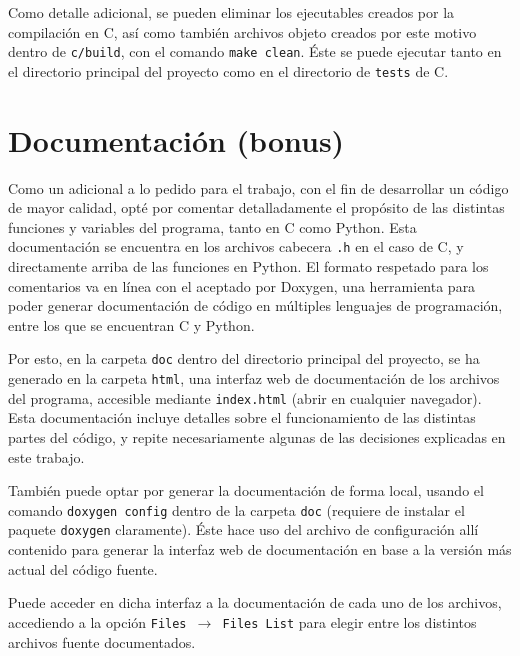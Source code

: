 \documentclass[a4paper]{article}
\begin{document}
Como detalle adicional, se pueden eliminar los ejecutables creados por la compilación en C, así como también archivos objeto creados por este motivo dentro de \texttt{c/build}, con el comando \texttt{make clean}. Éste se puede ejecutar tanto en el directorio principal del proyecto como en el directorio de \texttt{tests} de C.

\section{Documentación (bonus)}

Como un adicional a lo pedido para el trabajo, con el fin de desarrollar un código de mayor calidad, opté por comentar detalladamente el propósito de las distintas funciones y variables del programa, tanto en C como Python. Esta documentación se encuentra en los archivos cabecera \texttt{.h} en el caso de C, y directamente arriba de las funciones en Python. El formato respetado para los comentarios va en línea con el aceptado por Doxygen, una herramienta para poder generar documentación de código en múltiples lenguajes de programación, entre los que se encuentran C y Python. 

Por esto, en la carpeta \texttt{doc} dentro del directorio principal del proyecto, se ha generado en la carpeta \texttt{html}, una interfaz web de documentación de los archivos del programa, accesible mediante \texttt{index.html} (abrir en cualquier navegador). Esta documentación incluye detalles sobre el funcionamiento de las distintas partes del código, y repite necesariamente algunas de las decisiones explicadas en este trabajo.

También puede optar por generar la documentación de forma local, usando el comando \texttt{doxygen config} dentro de la carpeta \texttt{doc} (requiere de instalar el paquete \texttt{doxygen} claramente). Éste hace uso del archivo de configuración allí contenido para generar la interfaz web de documentación en base a la versión más actual del código fuente.

Puede acceder en dicha interfaz a la documentación de cada uno de los archivos, accediendo a la opción \texttt{Files $\rightarrow$ Files List} para elegir entre los distintos archivos fuente documentados.

\pagebreak

{}

\end{document}
